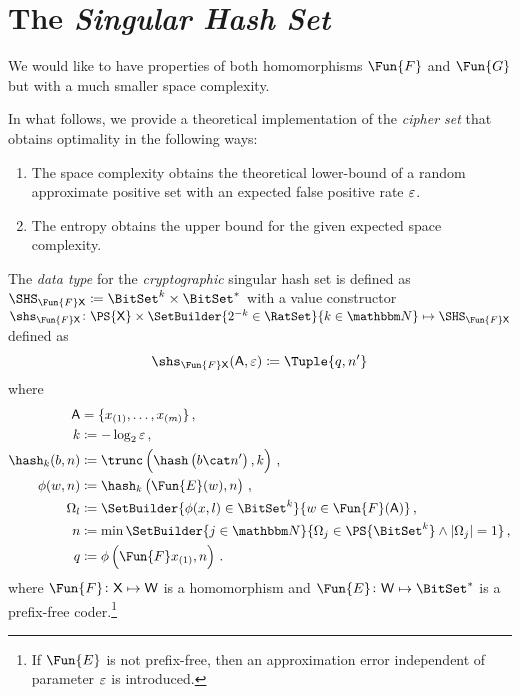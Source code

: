 \documentclass[ ../main.tex]{subfiles}
\begin{document}
\section{The \emph{Singular Hash Set}}
\label{sec:shs}
We would like to have properties of both homomorphisms $\Fun{F}$ and $\Fun{G}$ but with a much smaller space complexity.

In what follows, we provide a theoretical implementation of the \emph{cipher set} that obtains optimality in the following ways:
\begin{enumerate}
	\item The space complexity obtains the theoretical lower-bound of a random approximate positive set with an expected false positive rate $\varepsilon$.
	\item The entropy obtains the upper bound for the given expected space complexity.
\end{enumerate}

\begin{definition}
\label{alg:makeset}
	The \emph{data type} for the \emph{cryptographic} singular hash set is defined as $\SHS_{\Fun{F} \Set{X}} \coloneqq \BitSet^k \times \BitSet^*$ with a value constructor $\shs_{\Fun{F}\Set{X}} \colon \PS{\Set{X}} \times \SetBuilder{2^{-k} \in \RatSet}{k \in \NatSet} \mapsto \SHS_{\Fun{F} \Set{X}}$ defined as
	\begin{equation}
	\shs_{\Fun{F} \Set{X}}(\Set{A}, \fprate) \coloneqq \Tuple{q,n'}
	\end{equation}
	where
	\begin{equation}
	\begin{split}
	\Set{A}     & = \{x_{(1)},\ldots,x_{(m)}\}\,,\\
	k			& \coloneqq -\log_2 \fprate\,,\\
	\hash_k(b,n)& \coloneqq \trunc\left(\hash\left(b \cat n'\right),k\right)\,,\\	
	\phi(w,n) 	& \coloneqq \hash_k\left(\Fun{E}(w), n\right)\,,\\
	\Omega_l 	& \coloneqq \SetBuilder{\phi(x,l) \in \BitSet^k}{w \in \Fun{F}(\Set{A})}\,,\\
	n 			& \coloneqq \min\SetBuilder{ j \in \NatSet }{ \Omega_j \in \PS{\BitSet^k} \land \Card{\Omega_j} = 1}\,,\\
	q 			& \coloneqq \phi\left(\Fun{F} x_{(1)},n\right)\,.
	\end{split}
	\end{equation}
where $\Fun{F} \colon \Set{X} \mapsto \Set{W}$ is a homomorphism and $\Fun{E} \colon \Set{W} \mapsto \BitSet^*$ is a prefix-free coder.\footnote{If $\Fun{E}$ is not prefix-free, then an approximation error independent of parameter $\varepsilon$ is introduced.}
\end{definition}
\end{document}
